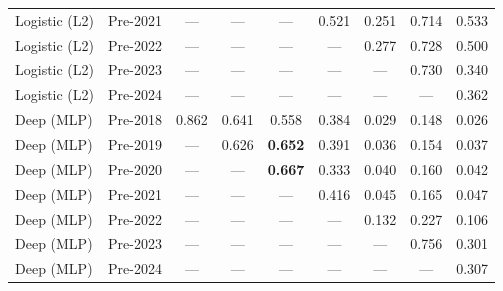 \begin{table}[htbp]
{\begin{tabular}{l lccccccc}
Logistic (L2) & Pre-2021 & --- & --- & --- & 0.521 & 0.251 & 0.714 & 0.533 \\
Logistic (L2) & Pre-2022 & --- & --- & --- & --- & 0.277 & 0.728 & 0.500 \\
Logistic (L2) & Pre-2023 & --- & --- & --- & --- & --- & 0.730 & 0.340 \\
Logistic (L2) & Pre-2024 & --- & --- & --- & --- & --- & --- & 0.362 \\
Deep (MLP) & Pre-2018 & 0.862 & 0.641 & 0.558 & 0.384 & 0.029 & 0.148 & 0.026 \\
Deep (MLP) & Pre-2019 & --- & 0.626 & \textbf{0.652} & 0.391 & 0.036 & 0.154 & 0.037 \\
Deep (MLP) & Pre-2020 & --- & --- & \textbf{0.667} & 0.333 & 0.040 & 0.160 & 0.042 \\
Deep (MLP) & Pre-2021 & --- & --- & --- & 0.416 & 0.045 & 0.165 & 0.047 \\
Deep (MLP) & Pre-2022 & --- & --- & --- & --- & 0.132 & 0.227 & 0.106 \\
Deep (MLP) & Pre-2023 & --- & --- & --- & --- & --- & 0.756 & 0.301 \\
Deep (MLP) & Pre-2024 & --- & --- & --- & --- & --- & --- & 0.307 \\
\bottomrule
\end{tabular}%
}
\end{table}